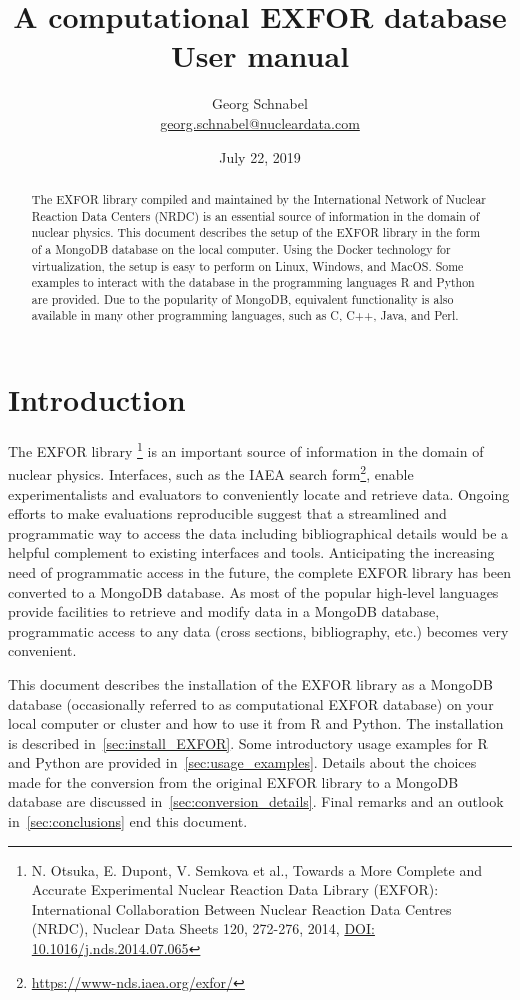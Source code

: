 \documentclass[12pt,a4paper]{scrartcl}
\title{\textbf{A computational EXFOR database} \\[2ex] User manual}
\date{July 22, 2019}
\author{Georg Schnabel \\ \href{mailto:georg.schnabel@nucleardata.com}{georg.schnabel@nucleardata.com}}
\begin{document}
 \maketitle
 \begin{abstract}
 The EXFOR library compiled and maintained by the International Network of Nuclear Reaction Data Centers (NRDC) is an essential source of information in the domain of nuclear physics.
 This document describes the setup of the EXFOR library in the form of a MongoDB database on the local computer.
 Using the Docker technology for virtualization, the setup is easy to perform on Linux, Windows, and MacOS.
 Some examples to interact with the database in the programming languages R and Python are provided.
 Due to the popularity of MongoDB, equivalent functionality is also available in many other programming languages, such as C, C++, Java, and Perl.
 \end{abstract} 
 \newpage
 \tableofcontents
 \newpage 

 \section{Introduction}
 The EXFOR library \footnote{N. Otsuka, E. Dupont, V. Semkova et al., Towards a More Complete and Accurate Experimental Nuclear Reaction Data Library (EXFOR): International Collaboration Between Nuclear Reaction Data Centres (NRDC), Nuclear Data Sheets 120, 272-276, 2014, \href{http://dx.doi.org/10.1016/j.nds.2014.07.065}{DOI: 10.1016/j.nds.2014.07.065}} is an important source of information in the domain of nuclear physics.
 Interfaces, such as the IAEA search form\footnote{\url{https://www-nds.iaea.org/exfor/}}, enable experimentalists and evaluators to conveniently locate and retrieve data.
 Ongoing efforts to make evaluations reproducible suggest that a streamlined and programmatic way to access the data including bibliographical details would be a helpful complement to existing interfaces and tools.
 Anticipating the increasing need of programmatic access in the future, the complete EXFOR library has been converted to a MongoDB database.
 As most of the popular high-level languages provide facilities to retrieve and modify data in a MongoDB database, programmatic access to any data (cross sections, bibliography, etc.) becomes very convenient.

  This document describes the installation of the EXFOR library as a MongoDB database (occasionally referred to as computational EXFOR database) on your local computer or cluster and how to use it from R and Python.
  The installation is described in~\cref{sec:install_EXFOR}.
  Some introductory usage examples for R and Python are provided in~\cref{sec:usage_examples}.
 Details about the choices made for the conversion from the original EXFOR library to a MongoDB database are discussed in~\cref{sec:conversion_details}.
 Final remarks and an outlook in~\cref{sec:conclusions} end this document.
 
\end{document}
